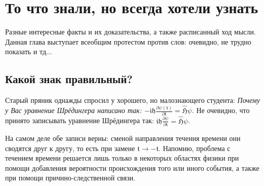 \newpage

\chapter{То что знали, но всегда хотели узнать}
\par Разные интересные факты и их доказательства, а также расписанный ход мысли. Данная глава выступает всеобщим протестом против слов: очевидно, не трудно показать и тд...
\section{Какой знак правильный?}
\par Старый пряник однажды спросил у хорошего, но малознающего студента: \textit{Почему у Вас уравнение Шрёдингера написано так: $ \mathfrak{ -i h \frac{\partial \psi(t)}{\partial t} = \hat{H}\psi } $}. Не очевидно, что принято записывать уравнение Шрёдингера так: $ \mathfrak{ i h \frac{\partial \psi}{\partial t} = \hat{H}\psi } $.
\par На самом деле обе записи верны: сменой направления течения времени они сводятся друг к другу, то есть при замене $\mathfrak{t \rightarrow -t}$. Напомню, проблема с течением времени решается лишь только в некоторых областях физики при помощи добавления вероятности происхождения того или иного события, а также при помощи причнно-следственной связи.
